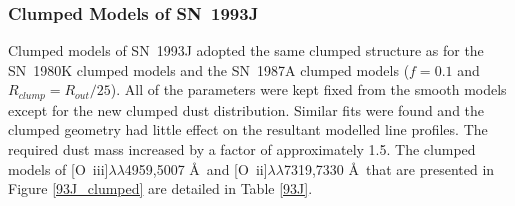 \subsubsection{Clumped Models of SN~1993J}

Clumped models of SN~1993J adopted the same clumped structure as for the SN~1980K clumped models and the SN~1987A clumped models ($f=0.1$ and $R_{clump}=R_{out}/25$).  All of the parameters were kept fixed from the smooth models except for the new clumped dust distribution.  Similar fits were found and the clumped geometry had little effect on the resultant modelled line profiles.   The required dust mass increased by a factor of approximately 1.5.  The clumped models of [O~{\sc iii}]$\lambda\lambda$4959,5007 \AA\ and [O~{\sc ii}]$\lambda\lambda$7319,7330 \AA\  that are presented in Figure \ref{93J_clumped} are detailed in Table \ref{93J}. 


